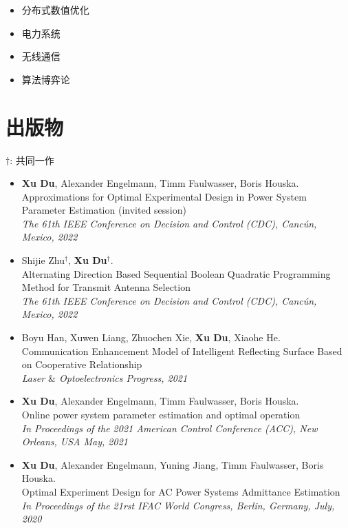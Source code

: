 \documentclass[paper=a4,fontsize=11pt]{scrartcl} %
\newcommand{\NewPart}[1]{\section*{\uppercase{#1}}}
\newcommand{\EducationEntry}[4]{
		\noindent \textbf{#1} \hfill      %
		\colorbox{White}{%
			\parbox{5cm}{%
			\hfill\color{Black}#2}} \par  %
		\noindent \textit{#3} \par        %
		\noindent\hangindent=2em\hangafter=0 \small #4 %
		\normalsize \par}
\begin{document}
\begin{CJK*}{UTF8}{gbsn}
\begin{itemize}
	\item{分布式数值优化}
	
	\item{电力系统}
	\item{无线通信}
	\item{算法博弈论}
\end{itemize}


\NewPart{出版物}{}
$\dag$:  共同一作
\begin{itemize}
		\item  { \textbf{Xu Du}, Alexander Engelmann, Timm Faulwasser, Boris Houska. \\
		{Approximations for Optimal Experimental Design
			in Power System Parameter Estimation (invited session)}\\
		\emph{ The 61th IEEE Conference on Decision and Control (CDC), Canc\'un, Mexico, 2022
		} }
	
	
	\item  { Shijie Zhu$^{\dag}$, \textbf{Xu Du}$^{\dag}$. \\
		{Alternating Direction Based Sequential Boolean Quadratic Programming Method for Transmit Antenna Selection}\\
		\emph{ The 61th IEEE Conference on Decision and Control (CDC), Canc\'un, Mexico, 2022
	} }
	
		\item  { Boyu Han, Xuwen Liang, Zhuochen Xie, \textbf{Xu Du}, Xiaohe He. \\
		{Communication Enhancement Model of Intelligent Reflecting Surface Based on Cooperative Relationship}\\
		\emph{Laser $\&$ Optoelectronics Progress, 2021
	} }
	
	\item  { \textbf{Xu Du}, Alexander Engelmann, Timm Faulwasser, Boris Houska. \\
		{Online power system parameter estimation and optimal operation}\\
		\emph{In Proceedings of the 2021 American Control Conference (ACC), New Orleans, USA May, 2021
	} }
	
		\item  {\textbf{Xu Du}, Alexander Engelmann, Yuning Jiang, Timm Faulwasser, Boris Houska. \\
		Optimal Experiment Design for AC Power Systems Admittance Estimation\\
		\emph{In Proceedings of the 21rst IFAC World Congress, Berlin, Germany, July, 2020
		} }
	

\end{itemize}
\end{CJK*}
\end{document}
